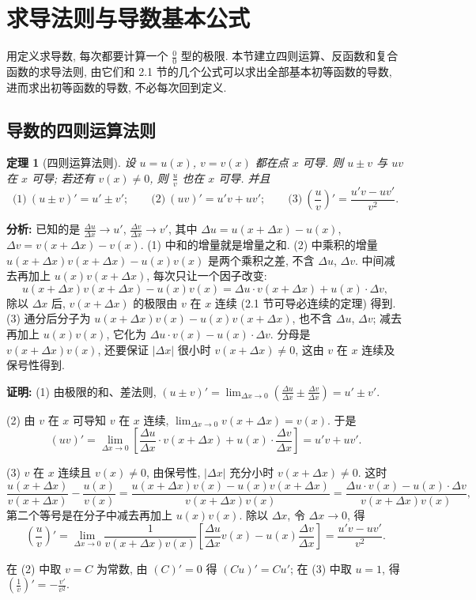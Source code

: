 \documentclass[UTF8,openany]{ctexbook}
\theoremstyle{chinesetextbook}
\newtheorem{theorem}{定理}[section]
\newenvironment{cnproof}{\par\indent\textbf{证明:} \ignorespaces}{\par}
\begin{document}
\section{求导法则与导数基本公式}
用定义求导数, 每次都要计算一个 $\displaystyle\frac00$ 型的极限. 本节建立四则运算、反函数和复合函数的求导法则, 由它们和 2.1 节的几个公式可以求出全部基本初等函数的导数, 进而求出初等函数的导数, 不必每次回到定义.
\subsection{导数的四则运算法则}
\begin{theorem}[四则运算法则]\label{thm:c2-2-arith}
设 $u=u(x)$, $v=v(x)$ 都在点 $x$ 可导. 则 $u\pm v$ 与 $uv$ 在 $x$ 可导; 若还有 $v(x)\ne0$, 则 $\displaystyle\frac uv$ 也在 $x$ 可导. 并且
\[
\text{(1)}\ (u\pm v)'=u'\pm v';\qquad\text{(2)}\ (uv)'=u'v+uv';\qquad\text{(3)}\ \left(\frac uv\right)'=\frac{u'v-uv'}{v^2}.
\]
\end{theorem}
\par\indent\textbf{分析:} 已知的是 $\displaystyle\frac{\Delta u}{\Delta x}\to u'$, $\displaystyle\frac{\Delta v}{\Delta x}\to v'$, 其中 $\Delta u=u(x+\Delta x)-u(x)$, $\Delta v=v(x+\Delta x)-v(x)$. (1) 中和的增量就是增量之和. (2) 中乘积的增量 $u(x+\Delta x)v(x+\Delta x)-u(x)v(x)$ 是两个乘积之差, 不含 $\Delta u$, $\Delta v$. 中间减去再加上 $u(x)v(x+\Delta x)$, 每次只让一个因子改变:
\[
u(x+\Delta x)v(x+\Delta x)-u(x)v(x)=\Delta u\cdot v(x+\Delta x)+u(x)\cdot\Delta v,
\]
除以 $\Delta x$ 后, $v(x+\Delta x)$ 的极限由 $v$ 在 $x$ 连续 (2.1 节可导必连续的定理) 得到. (3) 通分后分子为 $u(x+\Delta x)v(x)-u(x)v(x+\Delta x)$, 也不含 $\Delta u$, $\Delta v$; 减去再加上 $u(x)v(x)$, 它化为 $\Delta u\cdot v(x)-u(x)\cdot\Delta v$. 分母是 $v(x+\Delta x)v(x)$, 还要保证 $|\Delta x|$ 很小时 $v(x+\Delta x)\ne0$, 这由 $v$ 在 $x$ 连续及保号性得到.
\begin{cnproof}
(1) 由极限的和、差法则, $\displaystyle(u\pm v)'=\lim_{\Delta x\to0}\left(\frac{\Delta u}{\Delta x}\pm\frac{\Delta v}{\Delta x}\right)=u'\pm v'$.

(2) 由 $v$ 在 $x$ 可导知 $v$ 在 $x$ 连续, $\displaystyle\lim_{\Delta x\to0}v(x+\Delta x)=v(x)$. 于是
\[
(uv)'=\lim_{\Delta x\to0}\left[\frac{\Delta u}{\Delta x}\cdot v(x+\Delta x)+u(x)\cdot\frac{\Delta v}{\Delta x}\right]=u'v+uv'.
\]

(3) $v$ 在 $x$ 连续且 $v(x)\ne0$, 由保号性, $|\Delta x|$ 充分小时 $v(x+\Delta x)\ne0$. 这时
\[
\frac{u(x+\Delta x)}{v(x+\Delta x)}-\frac{u(x)}{v(x)}=\frac{u(x+\Delta x)v(x)-u(x)v(x+\Delta x)}{v(x+\Delta x)v(x)}=\frac{\Delta u\cdot v(x)-u(x)\cdot\Delta v}{v(x+\Delta x)v(x)},
\]
第二个等号是在分子中减去再加上 $u(x)v(x)$. 除以 $\Delta x$, 令 $\Delta x\to0$, 得
\[
\left(\frac uv\right)'=\lim_{\Delta x\to0}\frac1{v(x+\Delta x)v(x)}\left[\frac{\Delta u}{\Delta x}v(x)-u(x)\frac{\Delta v}{\Delta x}\right]=\frac{u'v-uv'}{v^2}.
\]
\end{cnproof}
在 (2) 中取 $v=C$ 为常数, 由 $(C)'=0$ 得 $(Cu)'=Cu'$; 在 (3) 中取 $u=1$, 得 $\displaystyle\left(\frac1v\right)'=-\frac{v'}{v^2}$.
\end{document}
